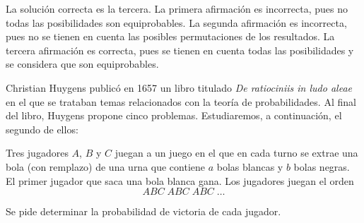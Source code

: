 \begin{solution}
  La solución correcta es la tercera. La primera afirmación es incorrecta,
  pues no todas las posibilidades son equiprobables. La segunda afirmación
  es incorrecta, pues no se tienen en cuenta las posibles permutaciones de
  los resultados. La tercera afirmación es correcta, pues se tienen en
  cuenta todas las posibilidades y se considera que son equiprobables.
\end{solution}

Christian Huygens publicó en 1657 un libro titulado \textit{De ratiociniis
in ludo aleae} en el que se trataban temas relacionados con la teoría de
probabilidades. Al final del libro, Huygens propone cinco problemas.
Estudiaremos, a continuación, el segundo de ellos:

\begin{exercise*}
  Tres jugadores $A$, $B$ y $C$ juegan a un juego en el que en cada turno
  se extrae una bola (con remplazo) de una urna que contiene $a$ bolas
  blancas y $b$ bolas negras. El primer jugador que saca una bola blanca
  gana. Los jugadores juegan el orden
  \[
    A B C \; A B C \; A B C \; \dots
  \]

  Se pide determinar la probabilidad de victoria de cada jugador.
\end{exercise*}


